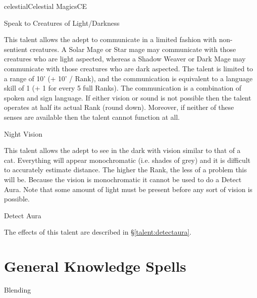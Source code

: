 \begin{College}[1.3]{celestial}{Celestial Magics}{CE}
\begin{talent}[T-1]{Speak to Creatures of Light/Darkness}
\begin{effects}
This talent allows the adept to communicate in a limited fashion with
non-sentient creatures.  A Solar Mage or Star mage may communicate
with those creatures who are light aspected, whereas a Shadow Weaver
or Dark Mage may communicate with those creatures who are dark
aspected.  The talent is limited to a range of 10’ (+ 10’ / Rank), and
the communication is equivalent to a language skill of 1 (+ 1 for
every 5 full Ranks).  The communication is a combination of spoken and
sign language.  If either vision or sound is not possible then the
talent operates at half its actual Rank (round down).  Moreover, if
neither of these senses are available then the talent cannot function
at all.
\end{effects}
\end{talent}

\begin{talent}[T-2]{Night Vision}

\begin{effects}
This talent allows the adept to see in the dark with vision similar to
that of a cat. Everything will appear monochromatic (i.e.  shades of
grey) and it is difficult to accurately estimate distance.  The higher
the Rank, the less of a problem this will be. Because the vision is
monochromatic it cannot be used to do a Detect Aura.  Note that some
amount of light must be present before any sort of vision is possible.
\end{effects}
\end{talent}

\begin{talent}[T-3]{Detect Aura}

\begin{effects}
 The effects of this talent are described in \S\ref{talent:detectaura}.
\end{effects}
\end{talent}


\section{General Knowledge Spells}

\begin{spell}[G-1]{Blending}


\end{spell}
\end{College}
